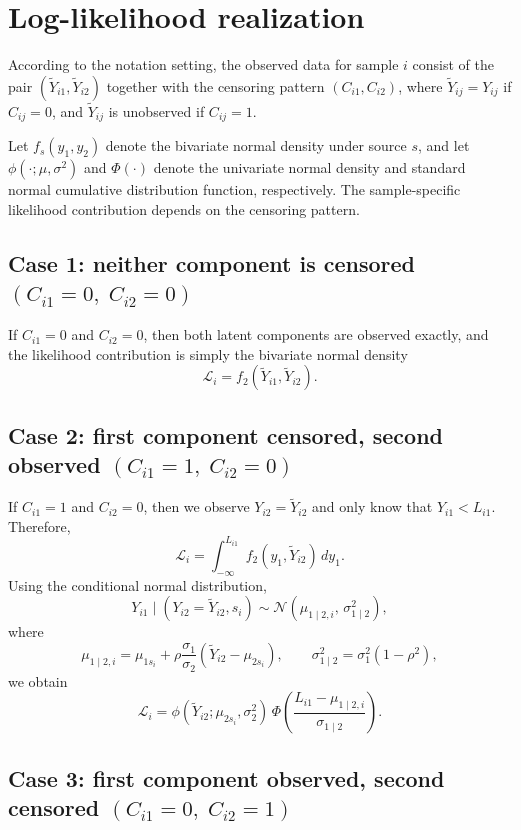 \documentclass[12pt]{article}
\begin{document}
\section{Log-likelihood realization}

According to the notation setting, the observed data for sample \(i\) consist of the pair \((\tilde Y_{i1},\tilde Y_{i2})\) together with the censoring pattern \((C_{i1},C_{i2})\), where \(\tilde Y_{ij}=Y_{ij}\) if \(C_{ij}=0\), and \(\tilde Y_{ij}\) is unobserved if \(C_{ij}=1\).

Let \(f_s(y_1,y_2)\) denote the bivariate normal density under source \(s\), and let \(\phi(\cdot;\mu,\sigma^2)\) and \(\Phi(\cdot)\) denote the univariate normal density and standard normal cumulative distribution function, respectively. The sample-specific likelihood contribution depends on the censoring pattern.

\subsection*{Case 1: neither component is censored \((C_{i1}=0,\; C_{i2}=0)\)}

If \(C_{i1}=0\) and \(C_{i2}=0\), then both latent components are observed exactly, and the likelihood contribution is simply the bivariate normal density
\[
\mathcal L_i
=
f_2(\tilde Y_{i1},\tilde Y_{i2}).
\]

\subsection*{Case 2: first component censored, second observed \((C_{i1}=1,\; C_{i2}=0)\)}

If \(C_{i1}=1\) and \(C_{i2}=0\), then we observe \(Y_{i2}=\tilde Y_{i2}\) and only know that \(Y_{i1}<L_{i1}\). Therefore,
\[
\mathcal L_i
=
\int_{-\infty}^{L_{i1}}
f_2(y_1,\tilde Y_{i2})\,dy_1.
\]
Using the conditional normal distribution,
\[
Y_{i1}\mid (Y_{i2}=\tilde Y_{i2}, s_i)
\sim
\mathcal N\!\left(
\mu_{1\mid 2,i},\,
\sigma_{1\mid 2}^2
\right),
\]
where
\[
\mu_{1\mid 2,i}
=
\mu_{1s_i}
+
\rho\frac{\sigma_1}{\sigma_2}(\tilde Y_{i2}-\mu_{2s_i}),
\qquad
\sigma_{1\mid 2}^2
=
\sigma_1^2(1-\rho^2),
\]
we obtain
\[
\mathcal L_i
=
\phi(\tilde Y_{i2};\mu_{2s_i},\sigma_2^2)\,
\Phi\!\left(
\frac{L_{i1}-\mu_{1\mid 2,i}}{\sigma_{1\mid 2}}
\right).
\]

\subsection*{Case 3: first component observed, second censored \((C_{i1}=0,\; C_{i2}=1)\)}
\end{document}

